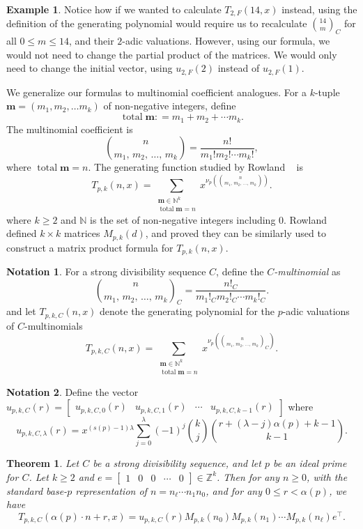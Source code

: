 \documentclass{amsart}
\newtheorem{theorem}{Theorem}
\theoremstyle{definition}
\newtheorem*{example*}{Example}
\newtheorem*{notation*}{Notation}
\DeclareMathOperator{\total}{total}
\newcommand{\N}{\mathbb{N}}
\newcommand{\colonequal}{\mathrel{\mathop:}=}
\begin{document}
\begin{example*}
Notice how if we wanted to calculate $T_{2,F}(14,x)$ instead, using the definition of the generating polynomial would require us to recalculate $\binom{14}{m}_C$ for all $0\leq m\leq 14$, and their $2$-adic valuations. However, using our formula, we would not need to change the partial product of the matrices. We would only need to change the initial vector, using $u_{2,F}(2)$ instead of $u_{2,F}(1)$.
\end{example*}

We generalize our formulas to multinomial coefficient analogues. For a $k$-tuple $\mathbf{m}=(m_1,m_2,\ldots m_k)$ of non-negative integers, define $$\total \mathbf{m}\colonequal m_1+m_2+\cdots m_k.$$
The multinomial coefficient is $$\binom{n}{m_1,\, m_2,\, \dots,\, m_k} = \frac{n!}{m_1!m_2!\cdots m_k!},$$ where $\total\mathbf{m}=n$.
The generating function studied by Rowland ~\cite{Rowland2018} is
\[
T_{p,k}(n, x) = \sum_{\substack{\mathbf{m} \in \N^k \\ \total\mathbf{m} = n}} x^{\nu_p\!\left(\binom{n}{m_1,\, m_2,\, \dots,\, m_k}\right)}.
\]
where $k\geq2$ and $\N$ is the set of non-negative integers including 0.
Rowland~\cite{Rowland2018} defined $k \times k$ matrices $M_{p,k}(d)$, and proved they can be similarly used to construct a matrix product formula for $T_{p,k}(n, x)$.

\begin{notation*}
For a strong divisibility sequence $C$, define the \emph{$C$-multinomial} as 
$$\binom{n}{m_1,\, m_2,\, \dots,\, m_k}_C=\frac{n!_C}{m_1!_C m_2!_C \cdots  m_k!_C}.$$
and let $T_{p,k,C}(n,x)$ denote the generating polynomial for the $p$-adic valuations of $C$-multinomials 
\[
T_{p,k,C}(n, x) = \sum_{\substack{\mathbf{m} \in \N^k \\ \total\mathbf{m} = n}} x^{\nu_p\!\left(\binom{n}{m_1,\, m_2,\, \dots,\, m_k}_C\right)}.
\]
\end{notation*}

\begin{notation*} 
Define the vector $u_{p,k,C}(r)=\begin{bmatrix}
    u_{p,k,C,0}(r)&u_{p,k,C,1}(r)&\cdots&u_{p,k,C,k-1}(r)
\end{bmatrix}$ where 
$$u_{p,k,C,\lambda}(r)=x^{(s(p)-1)\lambda}\sum_{j=0}^{\lambda}(-1)^j\binom{k}{j}\binom{r+(\lambda-j)\alpha(p)+k-1}{k-1}.$$
\end{notation*}
\begin{theorem}\label{thm:ideal_cmultinomial}
Let $ C $ be a strong divisibility sequence, and let $ p $ be an ideal prime for $ C $. Let $k \geq 2$ and $e=\begin{bmatrix}
    1&0&0&\cdots&0
\end{bmatrix}\in\mathbb{Z}^k$. Then for any $ n \geq 0 $, with the standard base-$p$ representation of $n = n_{\ell}\cdots n_1n_0$, and for any $ 0 \leq r < \alpha(p) $, we have
\[
T_{p,k,C}(\alpha(p) \cdot n + r, x)
= u_{p,k,C}(r) M_{p,k}(n_0) M_{p,k}(n_1) \cdots M_{p,k}(n_\ell) e^\intercal.
\]
\end{theorem}
\end{document}
